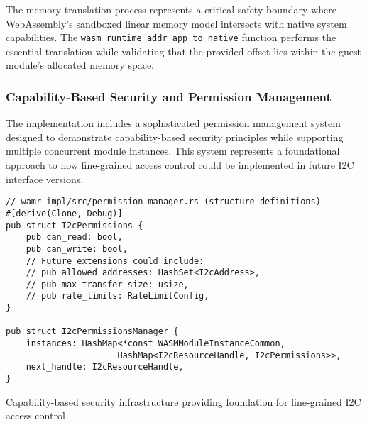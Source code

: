 The memory translation process represents a critical safety boundary where WebAssembly's sandboxed linear memory model intersects with native system capabilities. The \texttt{wasm\_runtime\_addr\_app\_to\_native} function performs the essential translation while validating that the provided offset lies within the guest module's allocated memory space.

\subsubsection{Capability-Based Security and Permission Management}

The implementation includes a sophisticated permission management system designed to demonstrate capability-based security principles while supporting multiple concurrent module instances. This system represents a foundational approach to how fine-grained access control could be implemented in future I2C interface versions.

\begin{listing}[H]
\begin{verbatim}
// wamr_impl/src/permission_manager.rs (structure definitions)
#[derive(Clone, Debug)]
pub struct I2cPermissions {
    pub can_read: bool,
    pub can_write: bool,
    // Future extensions could include:
    // pub allowed_addresses: HashSet<I2cAddress>,
    // pub max_transfer_size: usize,
    // pub rate_limits: RateLimitConfig,
}

pub struct I2cPermissionsManager {
    instances: HashMap<*const WASMModuleInstanceCommon, 
                      HashMap<I2cResourceHandle, I2cPermissions>>,
    next_handle: I2cResourceHandle,
}
\end{verbatim}
\caption{Capability-based security infrastructure providing foundation for fine-grained I2C access control}
\label{lst:permission-structures}
\end{listing}

